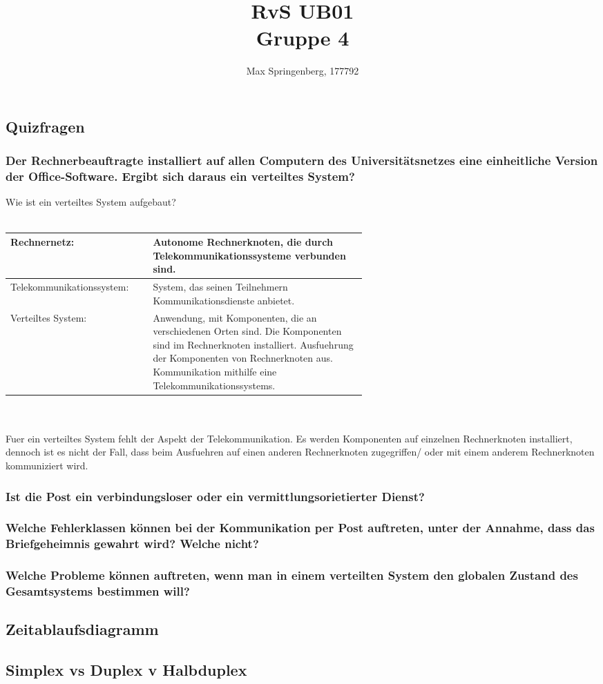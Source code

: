 \documentclass{article}
\author{Max Springenberg, 177792}
\title{
    RvS UB01\\
    Gruppe 4
}
\date{}
\begin{document}
\maketitle
\newpage

\subsection{Quizfragen}
\subsubsection{
    Der Rechnerbeauftragte installiert auf allen Computern des Universitätsnetzes 
    eine einheitliche Version der Office-Software. Ergibt sich daraus ein verteiltes System?
}
Wie ist ein verteiltes System aufgebaut?\\
\\
\begin{tabular}{|lp{0.6\linewidth}|}
    \hline
    Rechnernetz: & 
        Autonome Rechnerknoten, die durch Telekommunikationssysteme verbunden sind.\\
    \hline
    Telekommunikationssystem: &
        System, das seinen Teilnehmern Kommunikationsdienste anbietet.\\
    \hline
    Verteiltes System: &
        Anwendung, mit Komponenten, die an verschiedenen Orten sind.
        Die Komponenten sind im Rechnerknoten installiert.
        Ausfuehrung der Komponenten von Rechnerknoten aus.
        Kommunikation mithilfe eine Telekommunikationssystems.\\
    \hline
\end{tabular}\\
\\
Fuer ein verteiltes System fehlt der Aspekt der Telekommunikation. Es werden Komponenten auf
einzelnen Rechnerknoten installiert, dennoch ist es nicht der Fall, dass beim Ausfuehren auf
einen anderen Rechnerknoten zugegriffen/ oder mit einem anderem Rechnerknoten kommuniziert wird.\\
\subsubsection{
    Ist die Post ein verbindungsloser oder ein vermittlungsorietierter Dienst?
}
\subsubsection{
    Welche Fehlerklassen können bei der Kommunikation per Post auftreten, 
    unter der Annahme, dass das Briefgeheimnis gewahrt wird? Welche nicht?
}
\subsubsection{
    Welche Probleme können auftreten, wenn man in einem verteilten System den globalen Zustand des
    Gesamtsystems bestimmen will?
}
\subsection{Zeitablaufsdiagramm}
\subsection{Simplex vs Duplex v Halbduplex}
\end{document}
